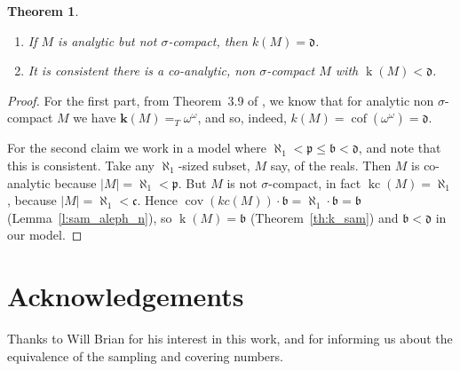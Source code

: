 \documentclass{article}
\newtheorem{thm}{Theorem}[section]
\newcommand{\te}{=_T}
\DeclareMathOperator{\cof}{cof}
\begin{document}
\begin{thm}\label{th:VDsoln} \ 
\begin{enumerate}[noitemsep,topsep=1pt]
\item[(i)] If $M$ is analytic but not $\sigma$-compact, then  $k(M)=\mathfrak{d}$. 

\item[(ii)] It is consistent there is a co-analytic, non $\sigma$-compact $M$  with $\mathop{k}(M) < \mathfrak{d}$.
\end{enumerate}
\end{thm}
\begin{proof} 
For the first part, from Theorem~3.9 of \cite{FG_Shape}, we know that for analytic non $\sigma$-compact $M$ we have 
$\mathbf{k}(M) \te \omega^\omega$, and so, indeed, $k(M)=\cof(\omega^\omega)=\mathfrak{d}$. 


For the second claim we work in a model where $\aleph_1 < \mathfrak{p} \le \mathfrak{b} < \mathfrak{d}$,  and note that this is consistent.  Take any $\aleph_1$-sized subset, $M$ say, of the reals. 
Then $M$ is co-analytic because $|M|=\aleph_1 < \mathfrak{p}$. But $M$ is not $\sigma$-compact, in fact $\mathop{kc}(M)=\aleph_1$, because $|M|=\aleph_1<\mathfrak{c}$. Hence $\mathop{cov}(kc(M))\cdot \mathfrak{b}=\aleph_1\cdot\mathfrak{b}=\mathfrak{b}$ (Lemma~\ref{l:sam_aleph_n}), so  $\mathop{k}(M)=\mathfrak{b}$ (Theorem~\ref{th:k_sam}) and $\mathfrak{b} <\mathfrak{d}$ in our model. 
\end{proof}

\section{Acknowledgements} Thanks to Will Brian for his interest in this work, and for informing us \cite{Brian} about the equivalence of the sampling and covering numbers.
\end{document}

